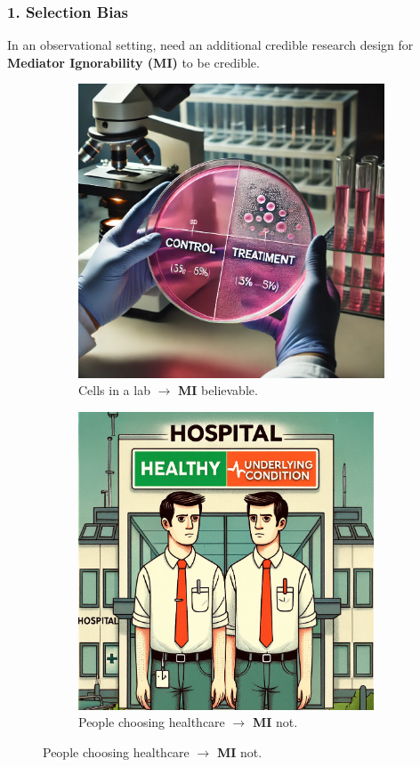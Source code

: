 \documentclass[dvipsnames]{beamer} %
\begin{document}
\begin{frame}
    \frametitle{1. Selection Bias}
    In an observational setting, need an additional credible research design for \textbf{Mediator Ignorability (MI)} to be credible.
    \vskip-0.5cm
    \begin{figure}[h!]
        \centering
        \singlespacing
        \begin{subfigure}[c]{0.475\textwidth}
            \centering
            \caption{Cells in a lab
                $\to$ \textbf{MI} believable.}
            \includegraphics[width=\textwidth]{presentation-files/figures/science-lab.png}
        \end{subfigure}
        \begin{subfigure}[c]{0.475\textwidth}
            \centering
            \caption{People choosing healthcare
                $\to$ \textbf{MI} not.}
            \includegraphics[width=0.965\textwidth]{presentation-files/figures/health-differences.png}

\end{subfigure}
\end{figure}
\end{frame}
\end{document}
